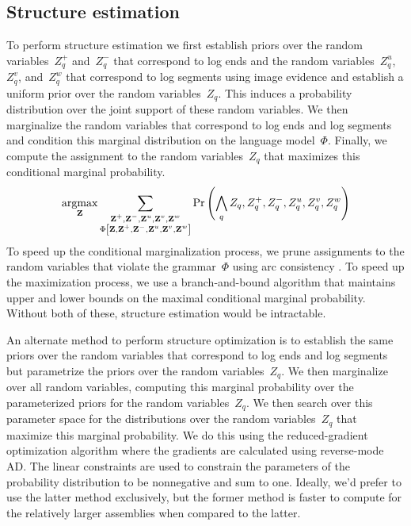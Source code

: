 \subsection{Structure estimation}
\label{sec-ll1:structure}
%
To perform structure estimation we first establish priors over the random
variables~$Z^+_q$ and~$Z^-_q$ that correspond to log ends and the random
variables~$Z^u_q$, $Z^v_q$, and~$Z^w_q$ that correspond to log segments using
image evidence and establish a uniform prior over the random variables~$Z_q$.
%
This induces a probability distribution over the joint support of these random
variables.
%
We then marginalize the random variables that correspond to log ends and log
segments and condition this marginal distribution on the language model~$\Phi$.
%
Finally, we compute the assignment to the random variables~$Z_q$ that maximizes
this conditional marginal probability.
%
\begin{displaymath}
\operatorname*{argmax}_{\mathbf{Z}}
\sum_{\substack{\mathbf{Z}^+,\mathbf{Z}^-,\mathbf{Z}^u,\mathbf{Z}^v,\mathbf{Z}^w\\
    \Phi\left[\mathbf{Z},\mathbf{Z}^+,\mathbf{Z}^-,\mathbf{Z}^u,\mathbf{Z}^v,\mathbf{Z}^w\right]}}
\Pr\left(\bigwedge_q Z_q,Z^+_q,Z^-_q,Z^u_q,Z^v_q,Z^w_q\right)
\end{displaymath}
%
To speed up the conditional marginalization process, we prune assignments to
the random variables that violate the grammar~$\Phi$ using arc consistency
\cite{Mackworth1977}.
%
To speed up the maximization process, we use a branch-and-bound algorithm
\cite{Land1960} that maintains upper and lower bounds on the maximal
conditional marginal probability.
%
Without both of these, structure estimation would be intractable.

An alternate method to perform structure optimization is to establish the same
priors over the random variables that correspond to log ends and log segments
but parametrize the priors over the random variables~$Z_q$.
%
We then marginalize over all random variables, computing this marginal
probability over the parameterized priors for the random variables~$Z_q$.
%
We then search over this parameter space for the distributions over the random
variables~$Z_q$ that maximize this marginal probability.
%
We do this using the reduced-gradient optimization algorithm
\cite{Wolfe1962,Wolfe1967} where the gradients are calculated using
reverse-mode AD.\@
%
The linear constraints are used to constrain the parameters of the probability
distribution to be nonnegative and sum to one.
%
Ideally, we'd prefer to use the latter method exclusively, but the former
method is faster to compute for the relatively larger assemblies when compared
to the latter.

